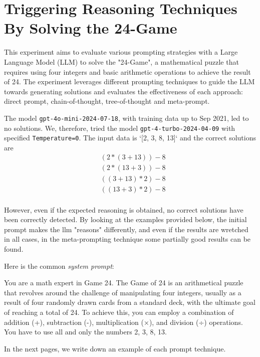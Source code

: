 \section{Triggering Reasoning Techniques By Solving the 24-Game}

This experiment aims to evaluate various prompting strategies with a Large Language Model (LLM) to solve the "24-Game", a mathematical puzzle that requires using four integers and basic arithmetic operations to achieve the result of 24. The experiment leverages different prompting techniques to guide the LLM towards generating solutions and evaluates the effectiveness of each approach: direct prompt, chain-of-thought, tree-of-thought and meta-prompt.

The model \texttt{gpt-4o-mini-2024-07-18}, with training data up to Sep 2021, led to no solutions. We, therefore, tried the model \texttt{gpt-4-turbo-2024-04-09} with specified \texttt{Temperature=0}. The input data is `[2, 3, 8, 13]` and the correct solutions are 
\begin{align*}
&(2 * (3 + 13)) - 8 \\
&(2 * (13 + 3)) - 8 \\
&((3 + 13) * 2) - 8 \\
&((13 + 3) * 2) - 8 \\
\end{align*}

However, even if the expected reasoning is obtained, no correct solutions have been correctly detected. By looking at the examples provided below, the initial prompt makes the llm "reasons" differently, and even if the results are wretched in all cases, in the meta-prompting technique some partially good results can be found.

Here is the common \textit{system prompt}: 
\begin{small}\begin{spverbatim}
You are a math expert in Game 24.
The Game of 24 is an arithmetical puzzle that revolves around the challenge of
manipulating four integers, usually as a result of four randomly drawn cards from a standard deck, with the ultimate goal of reaching a total of 24. To achieve this, you can employ a combination of addition (+),
subtraction (-), multiplication (×), and division (÷) operations. You have to use all and only the numbers 2, 3, 8, 13.
\end{spverbatim}\end{small}

In the next pages, we write down an example of each prompt technique.

